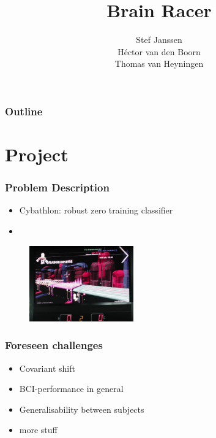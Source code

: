 \documentclass{beamer}
\title[RU style for Beamer]{
  Brain Racer}
\author[Stef, Hector, Thomas]{Stef Janssen\\H\'ector van den Boorn\\Thomas van Heyningen }
\begin{document}
\begin{frame}
  \titlepage
\end{frame}

\begin{frame}
  \frametitle{Outline}
  \tableofcontents
\end{frame}



\section{Project}
\begin{frame}
  \frametitle{Problem Description}
\begin{itemize}
 \item Cybathlon: robust zero training classifier
 \item 
\end{itemize}

  \begin{figure}
    \centering
    \includegraphics[width=0.4\textwidth]{cybathlon_challenge.png}
  \end{figure}
  
\end{frame}

\begin{frame}
  \frametitle{Foreseen challenges}

  \begin{itemize}
    \item Covariant shift
    \item BCI-performance in general
    \item Generalisability between subjects
    \item more stuff
  \end{itemize}
\end{frame}
\end{document}
